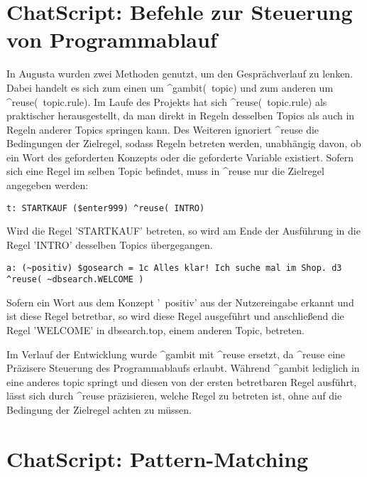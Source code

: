 \section{ChatScript: Befehle zur Steuerung von Programmablauf}
\label{sec:ChatScript: Befehle zur Steuerung von Programmablauf}

In Augusta wurden zwei Methoden genutzt, um den Gesprächverlauf zu lenken. Dabei handelt es sich zum einen um ^gambit(~topic) und zum anderen um ^reuse(~topic.rule). Im Laufe des Projekts hat sich ^reuse(~topic.rule) als praktischer herausgestellt, da man direkt in Regeln desselben Topics als auch in Regeln anderer Topics springen kann. Des Weiteren ignoriert ^reuse die Bedingungen der Zielregel, sodass Regeln betreten werden, unabhängig davon, ob ein Wort des geforderten Konzepts oder die geforderte Variable existiert. Sofern sich eine Regel im selben Topic befindet, muss in ^reuse nur die Zielregel angegeben werden:

\begin{lstlisting}[caption={Regel STARTKAUF in kaufabsicht.top}]
t: STARTKAUF ($enter999) ^reuse( INTRO)
\end{lstlisting}

Wird die Regel 'STARTKAUF' betreten, so wird am Ende der Ausführung in die Regel 'INTRO' desselben Topics übergegangen. 

\begin{lstlisting}[caption={Regel in keyexonesentence.top}]
a: (~positiv) $gosearch = 1c Alles klar! Ich suche mal im Shop. d3 ^reuse( ~dbsearch.WELCOME )
\end{lstlisting}

Sofern ein Wort aus dem Konzept '~positiv' aus der Nutzereingabe erkannt und ist diese Regel betretbar, so wird diese Regel ausgeführt und anschließend die Regel 'WELCOME' in dbsearch.top, einem anderen Topic, betreten.

Im Verlauf der Entwicklung wurde ^gambit mit ^reuse ersetzt, da ^reuse eine Präzisere Steuerung des Programmablaufs erlaubt. Während ^gambit lediglich in eine anderes topic springt und diesen von der ersten betretbaren Regel ausführt, lässt sich durch ^reuse präzisieren, welche Regel zu betreten ist, ohne auf die Bedingung der Zielregel achten zu müssen.  

\section{ChatScript: Pattern-Matching}
\label{sec:ChatScript: Pattern-Matching}

